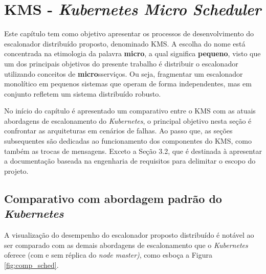 \chapter{KMS - \textit{Kubernetes Micro Scheduler}}

Este capítulo tem como objetivo apresentar os processos de desenvolvimento do escalonador distribuído proposto, denominado \ac{KMS}. A escolha do nome está concentrada na etimologia da palavra \textbf{micro}, a qual significa \textbf{pequeno}, visto que um dos principais objetivos do presente trabalho é distribuir o escalonador utilizando conceitos de \textbf{micro}sserviços. Ou seja, fragmentar um escalonador monolítico em pequenos sistemas que operam de forma independentes, mas em conjunto refletem um sistema distribuído robusto.

No início do capítulo é apresentado um comparativo entre o \ac{KMS} com as atuais abordagens de escalonamento do \textit{Kubernetes}, o principal objetivo nesta seção é confrontar as arquiteturas em cenários de falhas. Ao passo que, as seções subsequentes são dedicadas ao funcionamento dos componentes do \ac{KMS}, como também as trocas de mensagens. Exceto a Seção 3.2, que é destinada à apresentar a documentação baseada na engenharia de requisitos para delimitar o escopo do projeto.


\newpage
\section{Comparativo com abordagem padrão do \textit{Kubernetes}}
A visualização do desempenho do escalonador proposto distribuído é notável ao ser comparado com as demais abordagens de escalonamento que o \textit{Kubernetes} oferece (com e sem réplica do \textit{node master)}, como esboça a Figura \ref{fig:comp_sched}.


